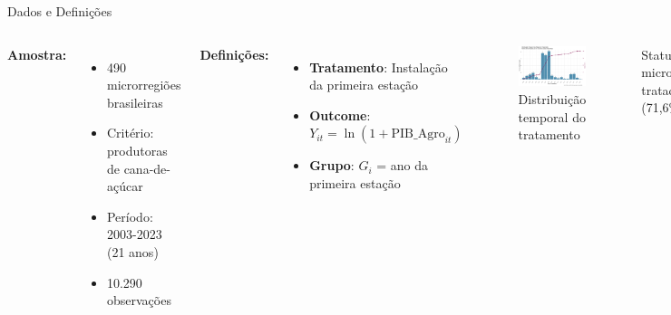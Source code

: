 \documentclass[10pt,aspectratio=169]{beamer}
\begin{document}
\begin{frame}{Dados e Definições}
\begin{columns}
\textbf{Amostra:}
\begin{itemize}
    \item 490 microrregiões brasileiras
    \item Critério: produtoras de cana-de-açúcar
    \item Período: 2003-2023 (21 anos)
    \item 10.290 observações
\end{itemize}

\vspace{0.3cm}
\textbf{Definições:}
\begin{itemize}
    \item \textbf{Tratamento}: Instalação da primeira estação
    \item \textbf{Outcome}: $Y_{it} = \ln(1 + \text{PIB\_Agro}_{it})$
    \item \textbf{Grupo}: $G_i$ = ano da primeira estação
\end{itemize}

\begin{figure}
\centering
\includegraphics[width=\textwidth]{../../../data/outputs/descriptive_analysis/distribuicao_temporal_tratamento.png}
\caption{Distribuição temporal do tratamento}
\end{figure}

\begin{block}{Status}
351 microrregiões tratadas (71,6\%)
\end{block}
\end{columns}
\end{frame}
\end{document}
